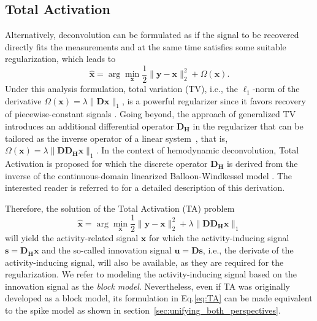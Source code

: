 \subsection{Total Activation}
Alternatively, deconvolution can be formulated as if the signal to be recovered
directly fits the measurements and at the same time satisfies some suitable
regularization, which leads to
\begin{equation}
\label{eq:analysis_model}
    \hat{\mathbf{x}} = \arg \min_{\mathbf{x}} \frac{1}{2} \| \mathbf{y} - \mathbf{x} \|_2^2 + \Omega(\mathbf{x}).
\end{equation}
Under this analysis formulation, total variation (TV), i.e., the $\ell_1$-norm
of the derivative $\Omega(\mathbf{x})=\lambda \|\mathbf{Dx}\|_1$, is a powerful
regularizer since it favors recovery of piecewise-constant signals
\citep{Chambolle2004TotalVariation}. Going beyond, the approach of generalized
TV introduces an additional differential operator $\mathbf{D_H}$ in the
regularizer that can be tailored as the inverse operator of a linear
system~\citep{Karahanoglu2011SignalProcessingApproach}, that is,
$\Omega(\mathbf{x})=\lambda \|\mathbf{D D_H x}\|_1$. In the context of
hemodynamic deconvolution, Total Activation is proposed for which the discrete
operator $\mathbf{D_H}$ is derived from the inverse of the continuous-domain
linearized Balloon-Windkessel model
\citep{Buxton1998BalloonModel,Friston2000Nonlinear-Balloon}. %
The interested reader is referred to
\citep{Khalidov2011ActiveletsWaveletssparse,Karahanoglu2011SignalProcessingApproach,
Karahanoglu2013TotalactivationfMRI} for a detailed description of this
derivation. 

Therefore, the solution of the Total Activation (TA) problem
\begin{equation}
\label{eq:TA}
    \hat{\mathbf{x}} = \arg \min_{\mathbf{x}} \frac{1}{2} \| \mathbf{y} - \mathbf{x} \|_2^2 + \lambda \|\mathbf{D D_H x} \|_1
\end{equation}
will yield the activity-related signal $\mathbf{x}$ for which the
activity-inducing signal $\mathbf{s}=\mathbf{D_H x}$ and the so-called
innovation signal $\mathbf{u}=\mathbf{Ds}$, i.e., the derivate
of the activity-inducing signal, will also be available, as they are required
for the regularization. We refer to modeling the activity-inducing signal based
on the innovation signal as the \textit{block model}.
Nevertheless, even if TA was originally developed as a block
model, its formulation in Eq.\eqref{eq:TA} can be made equivalent to the spike
model as shown in section~\ref{sec:unifying_both_perspectives}.

